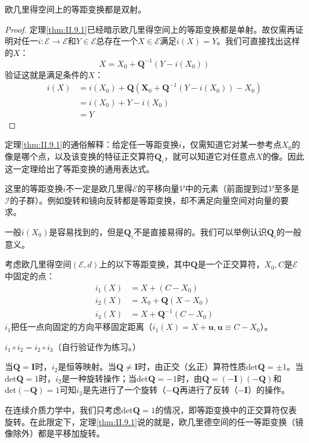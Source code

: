 \documentclass[main.tex]{subfiles}
\begin{document}
\begin{corollary}
欧几里得空间上的等距变换都是双射。
\end{corollary}
\begin{proof}
定理\ref{thm:II.9.1}已经暗示欧几里得空间上的等距变换都是单射。故仅需再证明对任一$i:
\mathcal{E}\rightarrow\mathcal{E}$和$Y\in\mathcal{E}$总存在一个$X\in\mathcal{E}$满足$i\left(X\right)=Y$。我们可直接找出这样的$X$：
\[
X=X_0+\mathbf{Q}^{-1}\left(Y-i\left(X_0\right)\right)
\]
验证这就是满足条件的$X$：
\begin{align*}
i\left(X\right)&=i\left(X_0\right)+\mathbf{Q}\left(\mathbf{X}_0+\mathbf{Q}^{-1}\left(Y-i\left(X_0\right)\right)-X_0\right)\\
&=i\left(X_0\right)+Y-i\left(X_0\right)\\
&=Y
\end{align*}
\end{proof}

定理\ref{thm:II.9.1}的通俗解释：给定任一等距变换$i$，仅需知道它对某一参考点$X_0$的像是哪个点，以及该变换的特征正交算符$\mathbf{Q}_i$，就可以知道它对任意点$X$的像。因此这一定理给出了等距变换的通用表达式。

这里的等距变换$i$不一定是欧几里得$\mathcal{E}$的平移向量$\mathcal{V}$中的元素（前面提到过$\mathcal{V}$至多是$\mathcal{I}$的子群）。例如旋转和镜向反转都是等距变换，却不满足向量空间对向量的要求。

一般$i\left(X_0\right)$是容易找到的，但是$\mathbf{Q}_i$不是直接易得的。我们可以举例认识$\mathbf{Q}_i$的一般意义。

\begin{example}
考虑欧几里得空间$\left(\mathcal{E},d\right)$上的以下等距变换，其中$\mathbf{Q}$是一个正交算符，$X_0,C$是$\mathcal{E}$中固定的点：
\begin{align*}
    i_1\left(X\right)&=X+\left(C-X_0\right)\\
    i_2\left(X\right)&=X_0+\mathbf{Q}\left(X-X_0\right)\\
    i_3\left(X\right)&=X+\mathbf{Q}^{-1}\left(C-X_0\right)
\end{align*}
$i_1$把任一点向固定的方向平移固定距离（$i_1\left(X\right)=X+\mathbf{u},\mathbf{u}\equiv C-X_0$）。

$i_1\circ i_2=i_2\circ i_3$（自行验证作为练习。）

当$\mathbf{Q}=\mathbf{I}$时，$i_2$是恒等映射。当$\mathbf{Q}\neq\mathbf{I}$时，由正交（幺正）算符性质$\mathrm{det}\mathbf{Q}=\pm 1$。当$\mathrm{det}\mathbf{Q}=1$时，$i_2$是一种旋转操作；当$\mathrm{det}\mathbf{Q}=-1$时，由$\mathbf{Q}=\left(-\mathbf{I}\right)\left(-\mathbf{Q}\right)$和$\mathrm{det}\left(-\mathbf{Q}\right)=1$可知$i_2$是先进行了一个旋转（$-\mathbf{Q}$再进行了反转（$-\mathbf{I}$）的操作。
\end{example}

在连续介质力学中，我们只考虑$\mathrm{det}\mathbf{Q}=1$的情况，即等距变换中的正交算符仅表旋转。在此限定下，定理\ref{thm:II.9.1}说的就是，欧几里德空间的任一等距变换（镜像除外）都是平移加旋转。
\end{document}
